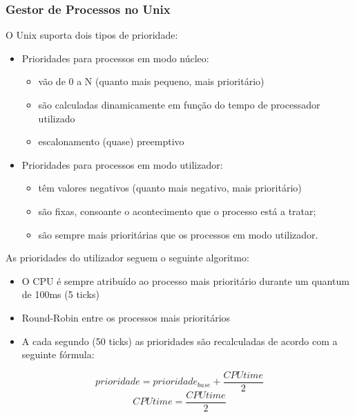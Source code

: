 \documentclass[11pt]{article}
\begin{document}
\subsubsection{Gestor de Processos no Unix}

O Unix suporta dois tipos de prioridade:
\begin{itemize}
    \item Prioridades para processos em modo núcleo:
          \begin{itemize}
              \item vão de 0 a N (quanto mais pequeno, mais prioritário)
              \item são calculadas dinamicamente em função do tempo de processador utilizado
              \item escalonamento (quase) preemptivo
          \end{itemize}
    \item Prioridades para processos em modo utilizador:
          \begin{itemize}
              \item têm valores negativos (quanto mais negativo, mais prioritário)
              \item são fixas, consoante o acontecimento que o processo está a tratar;
              \item são sempre mais prioritárias que os processos em modo utilizador.
          \end{itemize}
\end{itemize}

As prioridades do utilizador seguem o seguinte algoritmo:
\begin{itemize}
    \item O CPU é sempre atribuído ao processo mais prioritário durante um quantum de 100ms (5 ticks)
    \item Round-Robin entre os processos mais prioritários
    \item A cada segundo (50 ticks) as prioridades são recalculadas de acordo com a seguinte fórmula:
\end{itemize}
\begin{equation*}
    prioridade = prioridade_{base} + \frac{CPUtime}{2}
\end{equation*}
\begin{equation*}
    CPUtime = \frac{CPUtime}{2}
\end{equation*}
\end{document}
